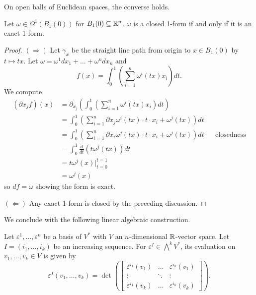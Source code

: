On open balls of Euclidean spaces, the converse holds. 
\begin{proposition}\label{prop: poincare lemma}
    Let $\omega\in\Omega^{1}(B_{1}(0))$ for $B_{1}(0)\subseteq\mathbb{R}^{n}$. $\omega$ is a closed 1-form if and only if it is an exact 1-form. 
\end{proposition}
\begin{proof}
    $(\Rightarrow)$ Let $\gamma_{x}$ be the straight line path from origin to $x\in B_{1}(0)$ by $t\mapsto tx$. Let $\omega=\omega^{1}dx_{1}+\dots+\omega^{n}dx_{n}$ and 
    $$f(x)=\int_{0}^{1}\left(\sum_{i=1}^{n}\omega^{i}(tx)x_{i}\right)dt.$$
    We compute 
    \begin{align*}
        (\partial x_{j}f)(x)&=\partial_{x_{j}}\left(\int_{0}^{1}\left(\sum_{i=1}^{n}\omega^{i}(tx)x_{i}\right)dt\right)\\
        &=\int_{0}^{1}\left(\sum_{i=1}^{n}\partial x_{j}\omega^{i}(tx)\cdot t\cdot x_{i}+\omega^{j}(tx)\right)dt \\
        &= \int_{0}^{1}\left(\sum_{i=1}^{n}\partial x_{i}\omega^{j}(tx)\cdot t\cdot x_{i}+\omega^{j}(tx)\right)dt && \text{closedness}\\
        &= \int_{0}^{1}\frac{d}{dt}(t\omega^{j}(tx))dt \\
        &= t\omega^{j}(x)|_{t=0}^{t=1} \\
        &= \omega^{j}(x)
    \end{align*}
    so $df=\omega$ showing the form is exact. 

    $(\Leftarrow)$ Any exact 1-form is closed by the preceding discussion. 
\end{proof}
We conclude with the following linear algebraic construction. 
\begin{definition}\label{def: evaluation of wedge k V star}
    Let $\varepsilon^{1},\dots,\varepsilon^{n}$ be a basis of $V^{*}$ with $V$ an $n$-dimensional $\mathbb{R}$-vector space. Let $I=(i_{1},\dots,i_{k})$ be an increasing sequence. For $\varepsilon^{I}\in\bigwedge^{k}V^{*}$, its evaluation on $v_{1},\dots,v_{k}\in V$ is given by 
    $$\varepsilon^{I}(v_{1},\dots,v_{k})=\det\left(\begin{bmatrix}
        \varepsilon^{i_{1}}(v_{1}) & \dots & \varepsilon^{i_{k}}(v_{1}) \\
        \vdots & \ddots & \vdots \\
        \varepsilon^{i_{1}}(v_{k}) & \dots & \varepsilon^{i_{k}}(v_{k})
    \end{bmatrix}\right).$$
\end{definition}